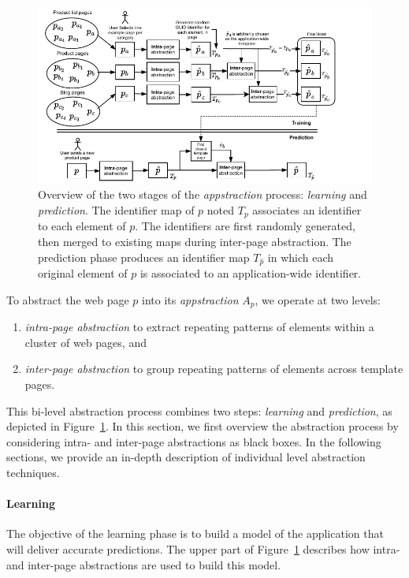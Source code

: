 \begin{figure}[ht]
  \centering
  \includegraphics[width=0.8\linewidth]{appstract/explanations/appstract_overview}
  \caption{Overview of the two stages of the \emph{appstraction} process: \emph{learning} and \emph{prediction}. The identifier map of $p$ noted $T_p$ associates an identifier to each element of $p$. The identifiers are first randomly generated, then merged to existing maps during inter-page abstraction. The prediction phase produces an identifier map $T_{\hat{p}}$ in which each original element of $p$ is associated to an application-wide identifier.}
  \label{fig:appstract_overview}
\end{figure}

To abstract the web page $p$ into its \emph{appstraction} $A_p$, we operate at two levels:
\begin{enumerate}
  \item \textit{intra-page abstraction} to extract repeating patterns of elements within a cluster of web pages, and
  \item \textit{inter-page abstraction} to group repeating patterns of elements across template pages.
\end{enumerate}

This bi-level abstraction process combines two steps: \emph{learning} and \emph{prediction}, as depicted in Figure~\ref{fig:appstract_overview}.
% 
In this section, we first overview the abstraction process by considering intra- and inter-page abstractions as black boxes. 
In the following sections, we provide an in-depth description of individual level abstraction techniques.

\paragraph{Learning}
The objective of the learning phase is to build a model of the application that will deliver accurate predictions.
The upper part of Figure~\ref{fig:appstract_overview} describes how intra- and inter-page abstractions are used to build this model.


